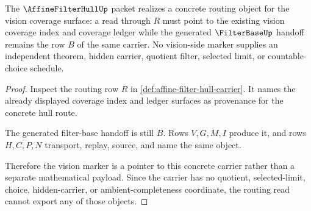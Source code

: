 \begin{theorem}
\label{thm:affine-filter-hull-vision-routing}
The $\AffineFilterHullUp$ packet realizes a concrete routing object for the vision coverage surface: a read through $R$ must point to the existing vision coverage index and coverage ledger while the generated $\FilterBaseUp$ handoff remains the row $B$ of the same carrier. No vision-side marker supplies an independent theorem, hidden carrier, quotient filter, selected limit, or countable-choice schedule.
\end{theorem}
\begin{proof}
Inspect the routing row $R$ in \autoref{def:affine-filter-hull-carrier}. It names the already displayed coverage index and ledger surfaces as provenance for the concrete hull route.

The generated filter-base handoff is still $B$. Rows $V,G,M,I$ produce it, and rows $H,C,P,N$ transport, replay, source, and name the same object.

Therefore the vision marker is a pointer to this concrete carrier rather than a separate mathematical payload. Since the carrier has no quotient, selected-limit, choice, hidden-carrier, or ambient-completeness coordinate, the routing read cannot export any of those objects.
\end{proof}




